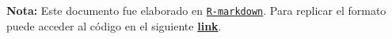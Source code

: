 \documentclass[11pt, a4paper]{awesome-cv}
\begin{document}
\vspace{1 cm}

\begin{center}

\textbf{Nota:} Este documento fue elaborado en \href{https://rmarkdown.rstudio.com/}{\texttt{R-markdown}}. Para replicar el formato puede acceder al código en el siguiente \textbf{\href{https://github.com/JDConejeros/CV}{link}}.

\end{center}
\end{document}
